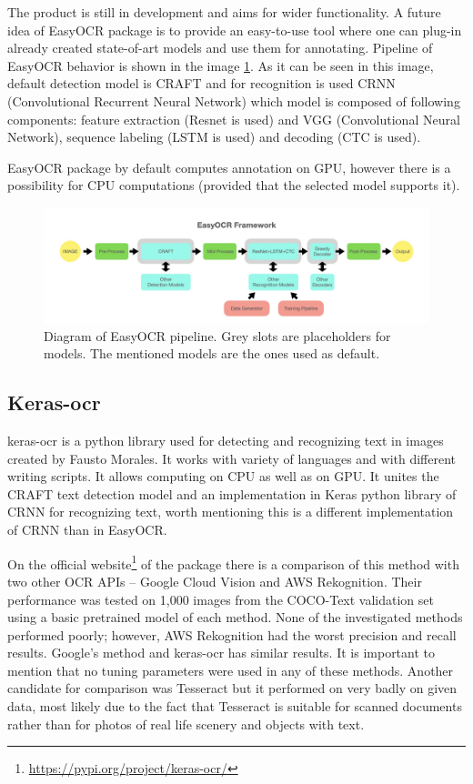 The product is still in development and aims for wider functionality. A future idea of EasyOCR package is to provide an easy-to-use tool where one can plug-in already created state-of-art models and use them for annotating. Pipeline of EasyOCR behavior is shown in the image \ref*{img:easyocrPipeline}. As it can be seen in this image, default detection model is CRAFT and for recognition is used CRNN (Convolutional Recurrent Neural Network) which model is composed of following components: feature extraction (Resnet is used) and VGG (Convolutional Neural Network), sequence labeling (LSTM is used) and decoding (CTC is used).\cite{easyocr2}

EasyOCR package by default computes annotation on GPU, however there is a possibility for CPU computations (provided that the selected model supports it). 

\begin{figure}[hbtp]
    \centering
    \includegraphics[scale=0.4]{obrazky/easyocr_framework.jpeg}
    \caption{Diagram of EasyOCR pipeline. Grey slots are placeholders for models. The mentioned models are the ones used as default. \cite{easyocr2}}
    \label{img:easyocrPipeline}
\end{figure}

\subsection{Keras-ocr}

keras-ocr is a python library used for detecting and recognizing text in images created by Fausto Morales. It works with variety of languages and with different writing scripts. It allows computing on CPU as well as on GPU.  It unites the CRAFT text detection model and an implementation in Keras python library of CRNN for recognizing text, worth mentioning this is a different implementation of CRNN than in EasyOCR.\cite{keras-ocr1}

On the official website\footnote{\url{https://pypi.org/project/keras-ocr/}} of the package there is a comparison of this method with two other OCR APIs -- Google Cloud Vision and AWS Rekognition. Their performance was tested on 1,000 images from the COCO-Text validation set using a basic pretrained model of each method. None of the investigated methods performed poorly; however, AWS Rekognition had the worst precision and recall results. Google's method and keras-ocr has similar results. It is important to mention that no tuning parameters were used in any of these methods. Another candidate for comparison was Tesseract but it performed on very badly on given data, most likely due to the fact that Tesseract is suitable for scanned documents rather than for photos of real life scenery and objects with text. \cite{keras-ocr1}


